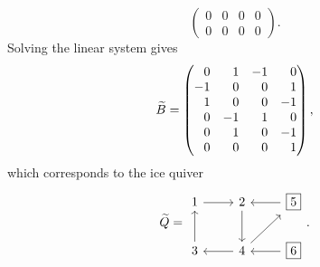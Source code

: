 \begin{example}
\begin{equation*}
\begin{pmatrix}
			0 & 0 & 0 & 0 \\
			0 & 0 & 0 & 0
		\end{pmatrix}.
	\end{equation*}
	Solving the linear system gives
	\begin{equation*}
		\tB = \begin{pmatrix*}[r]
			0  & 1  & -1 & 0  \\
			-1 & 0  & 0  & 1  \\
			1  & 0  & 0  & -1 \\
			0  & -1 & 1  & 0  \\
			0  & 1  & 0  & -1 \\
			0  & 0  & 0  & 1
		\end{pmatrix*},
	\end{equation*}
	which corresponds to the ice quiver
	\begin{equation*}
		\tQ =
		\begin{tikzcd}
			1 \rar & 2 \dar & \lar \boxed{5} \\
			3 \uar & 4 \lar \urar & \lar \boxed{6}
		\end{tikzcd}
		.
	\end{equation*}


\end{example}
